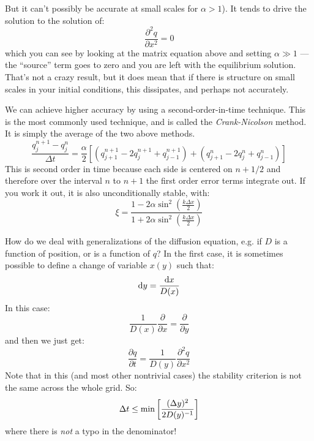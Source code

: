 But it can't possibly be accurate at small scales for $\alpha>1$). It
tends to drive the solution to the solution of:
\begin{equation}
\frac{\partial^2 q}{\partial x^2} = 0
\end{equation}
which you can see by looking at the matrix equation above and setting
$\alpha\gg 1$ --- the ``source'' term goes to zero and you are left
with the equilibrium solution.  That's not a crazy result, but it does
mean that if there is structure on small scales in your initial
conditions, this dissipates, and perhaps not accurately. 

We can achieve higher accuracy by using a second-order-in-time
technique.  This is the most commonly used technique, and is called
the {\it Crank-Nicolson} method. It is simply the average of the two
above methods. 
\begin{equation}
\frac{q_j^{n+1} - q_j^n}{\Delta t}
= \frac{\alpha}{2}
\left[
  \left(q_{j+1}^{n+1} - 2 q_j^{n+1} + q_{j-1}^{n+1}\right) + 
  \left(q_{j+1}^{n} - 2 q_j^{n} + q_{j-1}^{n}\right)
\right]
\end{equation}
This is second order in time because each side is centered on $n+1/2$
and therefore over the interval $n$ to $n+1$ the first order error
terms integrate out. If you work it out, it is also unconditionally
stable, with:
\begin{equation}
 \xi = \frac{1 - 2 \alpha \sin^2\left(\frac{k\Delta x}{2} \right)}{1 + 2 \alpha \sin^2\left(\frac{k\Delta x}{2} \right)}
\end{equation}

How do we deal with generalizations of the diffusion equation, e.g. if
$D$ is a function of position, or is a function of $q$? In the first
case, it is sometimes possible to define a change of variable $x(y)$
such that:
\begin{equation}
 {\rm d}y = \frac{{\rm d}x}{D(x)}
\end{equation}
In this case:
\begin{equation}
\frac{1}{D(x)} \frac{\partial}{\partial x} = \frac{\partial}{\partial
y}
\end{equation}
and then we just get:
\begin{equation}
\frac{\partial q}{\partial t} = \frac{1}{D(y)}\frac{\partial^2
q}{\partial x^2}
\end{equation}
Note that in this (and most other nontrivial cases) the stability
criterion is not the same across the whole grid. So:
\begin{equation}
\Delta t \le {\rm min} \left[\frac{(\Delta y)^2}{2 D(y)^{-1}}\right]
\end{equation}
where there is {\it not} a typo in the denominator! 

